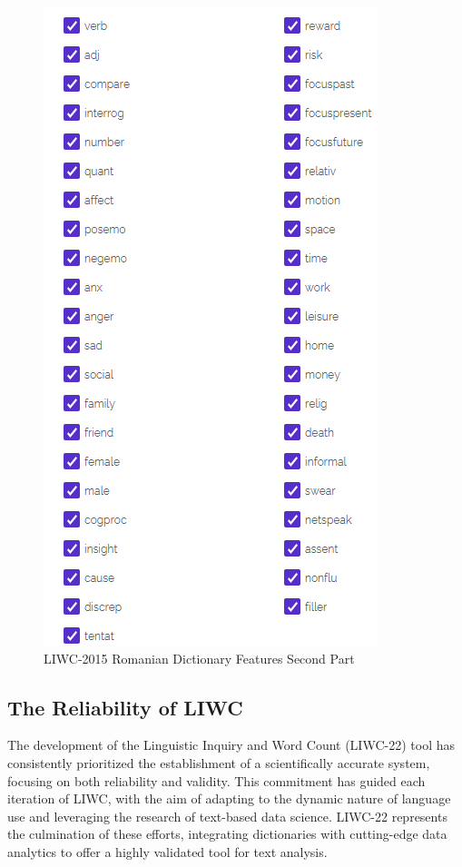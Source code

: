 \begin{figure}[htbp]
	\centering
		\includegraphics[scale=0.65]{./figures/LIWC2015RomanianFeatures2.png}
	\caption{LIWC-2015 Romanian Dictionary Features Second Part }
	\label{LIWC2015RomanianDicF2}
\end{figure}

\subsection{The Reliability of LIWC}

\quad The development of the Linguistic Inquiry and Word Count (LIWC-22) tool has consistently prioritized the establishment of a scientifically accurate system, focusing on both reliability and validity. This commitment has guided each iteration of LIWC, with the aim of adapting to the dynamic nature of language use and leveraging the research of text-based data science. LIWC-22 represents the culmination of these efforts, integrating dictionaries with cutting-edge data analytics to offer a highly validated tool for text analysis.

